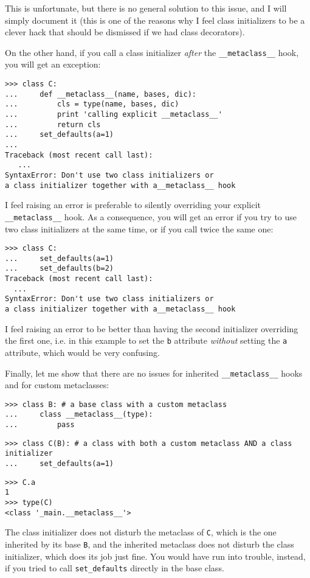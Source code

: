 \documentclass[10pt,a4paper,english]{article}
\begin{document}
This is unfortunate, but there is no general solution to this issue, and I will
simply document it (this is one of the reasons why I feel
class initializers to be a clever hack that should be dismissed if we
had class decorators).

On the other hand, if you call a class initializer
\emph{after} the \texttt{{\_}{\_}metaclass{\_}{\_}} hook, you will get an exception:
\begin{verbatim}>>> class C:
...     def __metaclass__(name, bases, dic):
...         cls = type(name, bases, dic)
...         print 'calling explicit __metaclass__'
...         return cls
...     set_defaults(a=1)
...
Traceback (most recent call last):
   ...
SyntaxError: Don't use two class initializers or
a class initializer together with a__metaclass__ hook\end{verbatim}

I feel raising an error is preferable to silently overriding your
explicit \texttt{{\_}{\_}metaclass{\_}{\_}} hook. As a consequence, you will get an
error if you try to use two class initializers at the same time, or
if you call twice the same one:
\begin{verbatim}>>> class C:
...     set_defaults(a=1)
...     set_defaults(b=2)
Traceback (most recent call last):
  ...
SyntaxError: Don't use two class initializers or
a class initializer together with a__metaclass__ hook\end{verbatim}

I feel raising an error to be better than having the second
initializer overriding the first one, i.e. in this example
to set the \texttt{b} attribute \emph{without} setting the \texttt{a} attribute,
which would be very confusing.

Finally, let me show that there are no issues for inherited
\texttt{{\_}{\_}metaclass{\_}{\_}} hooks and for custom metaclasses:
\begin{verbatim}>>> class B: # a base class with a custom metaclass
...     class __metaclass__(type):
...         pass\end{verbatim}
\begin{verbatim}>>> class C(B): # a class with both a custom metaclass AND a class initializer
...     set_defaults(a=1)\end{verbatim}
\begin{verbatim}>>> C.a
1
>>> type(C)
<class '_main.__metaclass__'>\end{verbatim}

The class initializer does not disturb the metaclass of \texttt{C}, which is
the one inherited by its base \texttt{B}, and the inherited metaclass does
not disturb the class initializer, which does its job just fine.
You would have run into trouble, instead, if you tried to call \texttt{set{\_}defaults}
directly in the base class.
\end{document}

